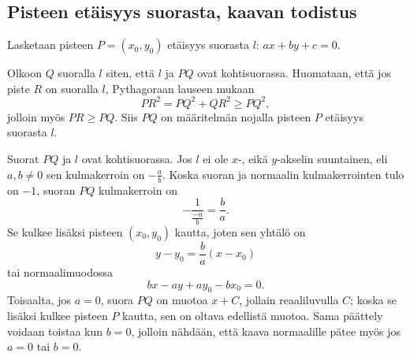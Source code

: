 \subsection*{Pisteen etäisyys suorasta, kaavan todistus}

Lasketaan pisteen $P = (x_0, y_0)$ etäisyys suorasta $l$: $ax+by+c=0$.

Olkoon $Q$ suoralla $l$ siten, että $l$ ja $PQ$ ovat kohtisuorassa. Huomataan, että jos piste $R$ on suoralla $l$, Pythagoraan lauseen mukaan
\[
PR^2 = PQ^2+QR^2 \geq PQ^2,
\]
jolloin myös $PR \geq PQ$. Siis $PQ$ on määritelmän nojalla pisteen $P$ etäisyys suorasta $l$.

Suorat $PQ$ ja $l$ ovat kohtisuorassa. Jos $l$ ei ole $x$-, eikä $y$-akselin suuntainen, eli $a,b \neq 0$ sen kulmakerroin on $-\frac{a}{b}$. Koska suoran ja normaalin kulmakerrointen tulo on $-1$, suoran $PQ$ kulmakerroin on
\[
-\frac{1}{\frac{-a}{b}} = \frac{b}{a}.
\]
Se kulkee lisäksi pisteen $(x_0,y_0)$ kautta, joten sen yhtälö on
\[
y-y_0 = \frac{b}{a}(x-x_0)
\]
tai normaalimuodossa
\[
bx-ay+ay_0-bx_0 = 0.
\]
Toisaalta, jos $a = 0$, suora $PQ$ on muotoa $x+C$, jollain reaaliluvulla $C$; koska se lisäksi kulkee pisteen $P$ kautta, sen on oltava edellistä muotoa. Sama päättely voidaan toistaa kun $b = 0$, jolloin nähdään, että kaava normaalille pätee myös jos $a = 0$ tai $b = 0$.


